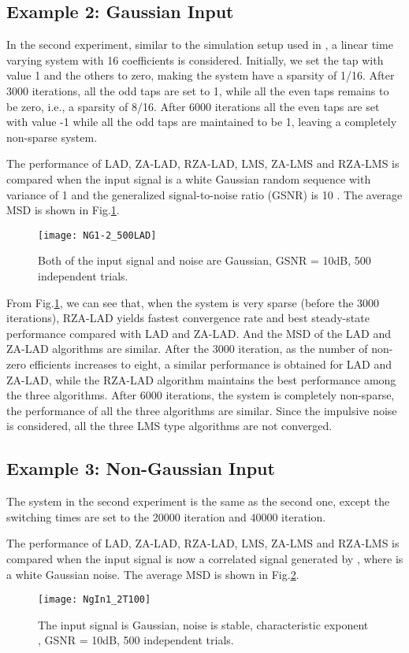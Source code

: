 \documentclass[conference]{IEEEtran}
\begin{document}
\subsection {Example 2: Gaussian Input}
\label{S4-2}
In the second experiment, similar to the simulation setup used in \cite{ref25}, a linear time varying system with 16 coefficients is considered. Initially, we set the  tap with value 1 and the others to zero, making the system have a sparsity of 1/16. After 3000 iterations, all the odd taps are set to 1, while all the even taps remains
to be zero, i.e., a sparsity of 8/16. After 6000 iterations all the even taps are set with value -1 while all the odd taps are maintained to be
1, leaving a completely non-sparse system. 

The performance of LAD, ZA-LAD, RZA-LAD, LMS, ZA-LMS and RZA-LMS is compared when the input signal is a white Gaussian random sequence with variance
of 1 and the generalized signal-to-noise ratio (GSNR) is 10 . The average MSD is shown in Fig.\ref{fig1_g}. 
\begin{figure}[!ht]
\centering
\texttt{[image: NG1-2\_500LAD]}
\caption{Both of the input signal and noise are Gaussian, GSNR = 10dB, 500 independent trials.}
\label{fig1_g}
\end{figure}

From Fig.\ref{fig1_g}, we can see that, when the system is very sparse (before the 3000 iterations),  RZA-LAD yields fastest convergence rate and best steady-state performance compared with LAD and ZA-LAD. And the MSD of the LAD  and ZA-LAD algorithms are similar. After the 3000 iteration, as the number of non-zero efficients increases to eight, a similar performance is obtained for LAD and ZA-LAD, while the RZA-LAD algorithm maintains the best performance among the three algorithms. After 6000 iterations, the system is completely non-sparse, the performance of all the three algorithms are similar.
Since the impulsive noise is considered, all the three LMS type algorithms are not converged.

\subsection {Example 3: Non-Gaussian Input}
\label{S4-3}
The system in the second experiment is the same as the second one, except the switching times are set to the 20000 iteration and 40000 iteration. 

The performance of LAD, ZA-LAD, RZA-LAD, LMS, ZA-LMS and RZA-LMS is compared when the input signal  is now a correlated signal generated by , where  is a white Gaussian noise. The average MSD is shown in Fig.\ref{fig2_ng}. 
\begin{figure}[!ht]
\centering
\texttt{[image: NgIn1\_2T100]}
\caption{The input signal is Gaussian, noise is   stable, characteristic exponent  , GSNR = 10dB, 500 independent trials.}
\label{fig2_ng}
\end{figure}
\end{document}
